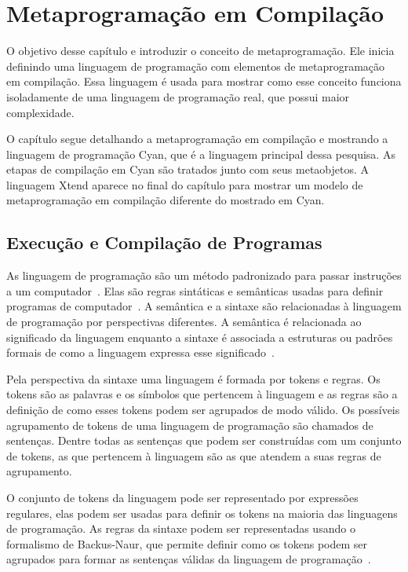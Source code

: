 \chapter{Metaprogramação em Compilação}
\label{cap:metaprog}

O objetivo desse capítulo e introduzir o conceito de metaprogramação. Ele inicia definindo uma linguagem de programação com elementos de metaprogramação em compilação. Essa linguagem é usada para mostrar como esse conceito funciona isoladamente de uma linguagem de programação real, que possui maior complexidade.

O capítulo segue detalhando a metaprogramação em compilação e mostrando a linguagem de programação Cyan, que é a linguagem principal dessa pesquisa. As etapas de compilação em Cyan são tratados junto com seus metaobjetos. A linguagem Xtend aparece no final do capítulo para mostrar um modelo de metaprogramação em compilação diferente do mostrado em Cyan.

\section{Execução e Compilação de Programas}

As linguagem de programação são um método padronizado para passar instruções a um computador~\cite{dershem1995programming}. Elas são regras sintáticas e semânticas usadas para definir programas de computador~\cite{fischer1993anatomy}. A semântica e a sintaxe são relacionadas à linguagem de programação por perspectivas diferentes. A semântica é relacionada ao significado da linguagem enquanto a sintaxe é associada a estruturas ou padrões formais de como a linguagem expressa esse significado~\cite{chomsky1955logical}.

Pela perspectiva da sintaxe uma linguagem é formada por tokens e regras. Os tokens são as palavras e os símbolos que pertencem à linguagem e as regras são a definição de como esses tokens podem ser agrupados de modo válido. Os possíveis agrupamento de tokens de uma linguagem de programação são chamados de sentenças. Dentre todas as sentenças que podem ser construídas com um conjunto de tokens, as que pertencem à linguagem são as que atendem a suas regras de agrupamento.

O conjunto de tokens da linguagem pode ser representado por expressões regulares, elas podem ser usadas para definir os tokens na maioria das linguagens de programação. As regras da sintaxe podem ser representadas usando o formalismo de Backus-Naur, que permite definir como os tokens podem ser agrupados para formar as sentenças válidas da linguagem de programação~\cite{aho1977principles}.

